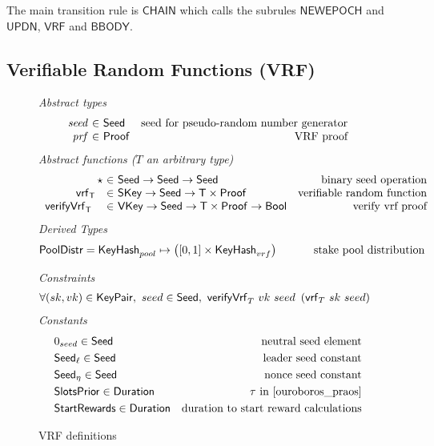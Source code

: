 The main transition rule is $\mathsf{CHAIN}$ which calls the subrules
$\mathsf{NEWEPOCH}$ and $\mathsf{UPDN}$, $\mathsf{VRF}$ and $\mathsf{BBODY}$.

\subsection{Verifiable Random Functions (VRF)}
\label{sec:defs-vrf}

\begin{figure}[htb]
  \emph{Abstract types}
  \begin{equation*}
    \begin{array}{r@{~\in~}lr}
      \var{seed} & \Seed  & \text{seed for pseudo-random number generator}\\
      \var{prf} & \Proof  & \text{VRF proof}\\
    \end{array}
  \end{equation*}
  \emph{Abstract functions ($T$ an arbitrary type)}
  \begin{equation*}
    \begin{array}{r@{~\in~}lr}
      \seedOp & \Seed \to \Seed \to \Seed & \text{binary seed operation} \\
      \vrf{\T}{}{} & \SKey \to \Seed \to \T\times\Proof
                   & \text{verifiable random function} \\
      \verifyVrf{\T}{}{}{} & \VKey \to \Seed \to \T\times\Proof \to \Bool
                           & \text{verify vrf proof} \\
    \end{array}
  \end{equation*}
  \emph{Derived Types}
  \begin{align*}
    \mathsf{PoolDistr} = \mathsf{KeyHash}_{pool} \mapsto \left([0, 1]\times\mathsf{KeyHash}_{vrf}\right)
      \text{ \hspace{1cm}stake pool distribution}
  \end{align*}

  \emph{Constraints}
  \begin{align*}
    & \forall (sk, vk) \in \mathsf{KeyPair},~ seed \in \mathsf{Seed},~
    \mathsf{verifyVrf}_{T} ~ vk ~ seed ~\left(\mathsf{vrf}_{T} ~ sk ~ seed\right)
  \end{align*}
  \emph{Constants}
  \begin{align*}
    & 0_{seed} \in \mathsf{Seed} & \text{neutral seed element} \\
    & \mathsf{Seed}_\ell \in \mathsf{Seed} & \text{leader seed constant} \\
    & \mathsf{Seed}_\eta \in \mathsf{Seed} & \text{nonce seed constant}\\
    & \mathsf{SlotsPrior} \in \mathsf{Duration} & \tau\text{ in \cite{ouroboros_praos}}\\
    & \mathsf{StartRewards} \in \mathsf{Duration} & \text{duration to start reward calculations}\\
  \end{align*}

  \caption{VRF definitions}
  \label{fig:defs-vrf}
\end{figure}

